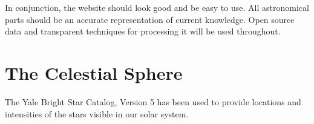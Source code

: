 \documentclass[11pt]{article}
\begin{document}
In conjunction, the website should look good and be easy to use. All astronomical parts should be an accurate representation of current knowledge. Open source data and transparent techniques for processing it will be used throughout. 

\section{The Celestial Sphere}
The Yale Bright Star Catalog, Version 5 has been used to provide locations and intensities of the stars visible in our solar system. 
\end{document}
